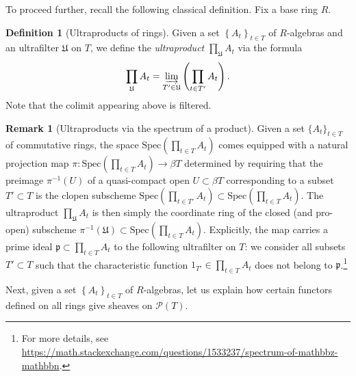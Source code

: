 \documentclass[reqno]{amsart}
\theoremstyle{definition}
\newtheorem{definition}[theorem]{Definition}
\newtheorem{remark}[theorem]{Remark}
\begin{document}
To proceed further, recall the following classical definition.
Fix a base ring $R$. 
\begin{definition}[Ultraproducts of rings]
Given a set $\left\{A_t\right\}_{t \in T}$ of $R$-algebras and an ultrafilter  $\mathfrak{U}$ on $T$, we define the \emph{ultraproduct} $\prod_{\mathfrak{U}} A_t$ via the formula
\[ \prod_{\mathfrak{U}} A_t = \varinjlim_{T' \in \mathfrak{U}} \left(  \prod_{t
\in T'} A_t \right). \]
Note that the colimit appearing above is filtered.
\end{definition} 

\begin{remark}[Ultraproducts via the spectrum of a product]
\label{UltraprodSpec}
Given a set $\{A_t\}_{t \in T}$ of commutative rings, the space $\mathrm{Spec}(\prod_{t \in T} A_t)$ comes equipped with a natural projection map $\pi\colon \mathrm{Spec}(\prod_{t \in T} A_t) \to \beta T$ determined by requiring that the preimage $\pi^{-1}(U)$ of a quasi-compact open $U \subset \beta T$ corresponding to a subset $T' \subset T$ is the clopen subscheme $\mathrm{Spec}(\prod_{t \in T'} A_t) \subset \mathrm{Spec}(\prod_{t \in T} A_t)$. The ultraproduct $\prod_{\mathfrak{U}} A_t$ is then simply the coordinate ring of the closed (and pro-open) subscheme $\pi^{-1}(\mathfrak{U}) \subset \mathrm{Spec}(\prod_{t \in T} A_t)$. 
Explicitly, the map 
carries a prime ideal $\mathfrak{p} \subset \prod_{t \in T} A_t$ to the
following ultrafilter on $T$: we consider all subsets $T' \subset T$ such that
the characteristic function $1_{T'} \in \prod_{t \in T} A_t$ does not belong to
$\mathfrak{p}$.\footnote{For more details, see
\url{https://math.stackexchange.com/questions/1533237/spectrum-of-mathbbz-mathbbn}.} 
\end{remark}

Next, given a set $\left\{A_t\right\}_{t \in T}$ of $R$-algebras, let us explain how certain functors defined on all rings give sheaves on $\mathcal{P}(T)$.
\end{document}
